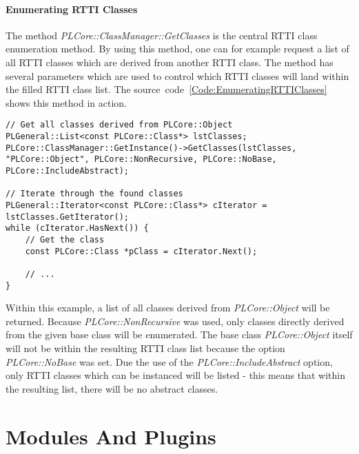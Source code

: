 \paragraph{Enumerating RTTI Classes}
The method \emph{PLCore::ClassManager::GetClasses} is the central RTTI class enumeration method. By using this method, one can for example request a list of all RTTI classes which are derived from another RTTI class. The method has several parameters which are used to control which RTTI classes will land within the filled RTTI class list. The source~code~\ref{Code:EnumeratingRTTIClasses} shows this method in action.
\begin{lstlisting}[float=htb,label=Code:EnumeratingRTTIClasses,caption={Enumerating RTTI classes}]
// Get all classes derived from PLCore::Object
PLGeneral::List<const PLCore::Class*> lstClasses;
PLCore::ClassManager::GetInstance()->GetClasses(lstClasses, "PLCore::Object", PLCore::NonRecursive, PLCore::NoBase, PLCore::IncludeAbstract);

// Iterate through the found classes
PLGeneral::Iterator<const PLCore::Class*> cIterator = lstClasses.GetIterator();
while (cIterator.HasNext()) {
	// Get the class
	const PLCore::Class *pClass = cIterator.Next();

	// ...
}
\end{lstlisting}
Within this example, a list of all classes derived from \emph{PLCore::Object} will be returned. Because \emph{PLCore::NonRecursive} was used, only classes directly derived from the given base class will be enumerated. The base class \emph{PLCore::Object} itself will not be within the resulting RTTI class list because the option \emph{PLCore::NoBase} was set. Due the use of the \emph{PLCore::IncludeAbstract} option, only RTTI classes which can be instanced will be listed - this means that within the resulting list, there will be no abstract classes.




\section{Modules And Plugins}
